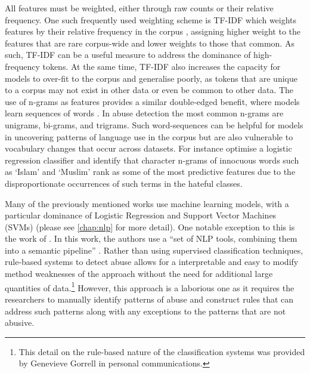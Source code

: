 All features must be weighted, either through raw counts or their relative frequency.  
One such frequently used weighting scheme is TF-IDF which weights features by their relative frequency in the corpus \citep{Fortuna:2018}, assigning higher weight to the features that are rare corpus-wide and lower weights to those that common.  
As such, TF-IDF can be a useful measure to address the dominance of high-frequency tokens.  
At the same time, TF-IDF also increases the capacity for models to over-fit to the corpus and generalise poorly, as tokens that are unique to a corpus may not exist in other data or even be common to other data.  
The use of n-grams as features provides a similar double-edged benefit, where models learn sequences of words .  
In abuse detection the most common n-grams are unigrams, bi-grams, and trigrams.  
Such word-sequences can be helpful for models in uncovering patterns of language use in the corpus but are also vulnerable to vocabulary changes that occur across datasets.  
For instance \citet{Waseem-Hovy:2016} optimise a logistic regression classifier and identify that character n-grams of innocuous words such as `Islam' and `Muslim' rank as some of the most predictive features due to the disproportionate occurrences of such terms in the hateful classes.  
  
Many of the previously mentioned works use  machine learning models, with a particular dominance of Logistic Regression and Support Vector Machines (SVMs) (please see \cref{chap:nlp} for more detail).  
One notable exception to this is the work of \citet{Gorrell:2018}.  
In this work, the authors use a ``set of NLP tools, combining them into a semantic pipeline'' \citep[pp. 601]{Gorrell:2018}.  
Rather than using supervised classification techniques,  rule-based systems to detect abuse allows for a interpretable and easy to modify method weaknesses of the approach without the need for additional large quantities of data.\footnote{This detail on the rule-based nature of the classification systems was provided by Genevieve Gorrell in personal communications.}  
However, this approach is a laborious one as it requires the researchers to manually identify patterns of abuse and construct rules that can address such patterns along with any exceptions to the patterns that are not abusive.  
  
